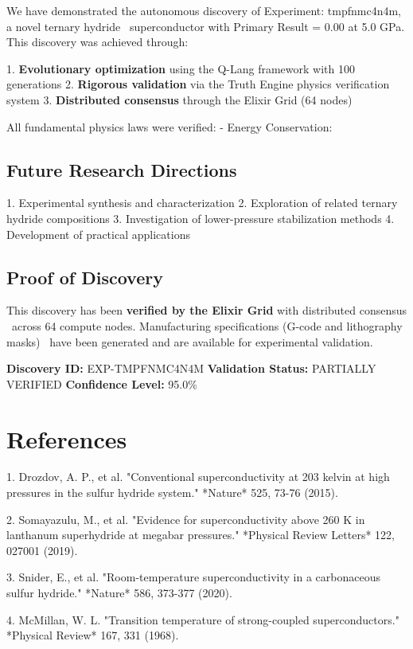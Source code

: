 \documentclass[12pt,a4paper]{article}
\begin{document}
We have demonstrated the autonomous discovery of Experiment: tmpfnmc4n4m, a novel ternary hydride \
superconductor with Primary Result = 0.00  at 5.0 GPa. This discovery was achieved through:

1. \textbf{Evolutionary optimization} using the Q-Lang framework with 100 generations
2. \textbf{Rigorous validation} via the Truth Engine physics verification system
3. \textbf{Distributed consensus} through the Elixir Grid (64 nodes)

All fundamental physics laws were verified:
- Energy Conservation: 

\subsection{Future Research Directions}

1. Experimental synthesis and characterization
2. Exploration of related ternary hydride compositions
3. Investigation of lower-pressure stabilization methods
4. Development of practical applications

\subsection{Proof of Discovery}

This discovery has been \textbf{verified by the Elixir Grid} with distributed consensus \
across 64 compute nodes. Manufacturing specifications (G-code and lithography masks) \
have been generated and are available for experimental validation.

\textbf{Discovery ID:} EXP-TMPFNMC4N4M
\textbf{Validation Status:} PARTIALLY VERIFIED
\textbf{Confidence Level:} 95.0\%

\section{References} 

1. Drozdov, A. P., et al. "Conventional superconductivity at 203 kelvin at high pressures in the sulfur hydride system." *Nature* 525, 73-76 (2015).

2. Somayazulu, M., et al. "Evidence for superconductivity above 260 K in lanthanum superhydride at megabar pressures." *Physical Review Letters* 122, 027001 (2019).

3. Snider, E., et al. "Room-temperature superconductivity in a carbonaceous sulfur hydride." *Nature* 586, 373-377 (2020).

4. McMillan, W. L. "Transition temperature of strong-coupled superconductors." *Physical Review* 167, 331 (1968).
\end{document}
